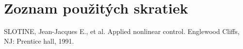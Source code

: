 \documentclass[a4paper,slovak,12pt,appendix,twoside,openright]{article}
\begin{document}




%

%

\newpage
\tableofcontents{}
\setcounter{secnumdepth}{0}
\newpage
\section{Zoznam použitých skratiek}

 
\setcounter{secnumdepth}{1}



{
	\sectionfont{\sectionrule{0pt}{0pt}{-2ex}{0.5pt}}
}
{
	\sectionfont{\sectionrule{0pt}{0pt}{-2ex}{0pt}}
}




%

%



\newpage
{}
%


\begin{thebibliography}{9}
 SLOTINE, Jean-Jacques E., et al. Applied nonlinear control. Englewood Cliffs, NJ: Prentice hall, 1991.
\end{thebibliography}
\appendix

\end{document}
